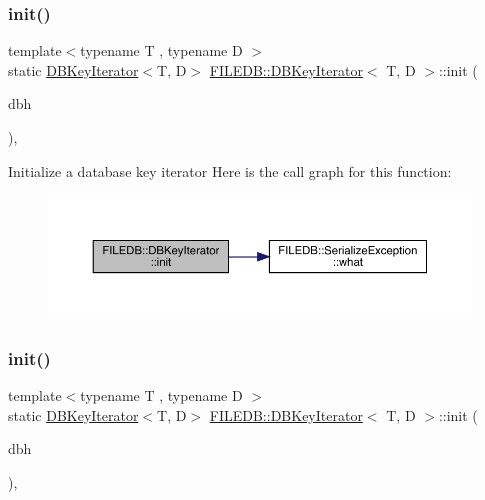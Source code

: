 \subsubsection{\texorpdfstring{init()}{init()}\hspace{0.1cm}{\footnotesize\ttfamily [2/3]}}
{\footnotesize\ttfamily template$<$typename T , typename D $>$ \\
static \mbox{\hyperlink{classFILEDB_1_1DBKeyIterator}{D\+B\+Key\+Iterator}}$<$T, D$>$ \mbox{\hyperlink{classFILEDB_1_1DBKeyIterator}{F\+I\+L\+E\+D\+B\+::\+D\+B\+Key\+Iterator}}$<$ T, D $>$\+::init (\begin{DoxyParamCaption}\item[{\mbox{\hyperlink{adat-devel_2other__libs_2filedb_2filehash_2ffdb__db_8h_a0b27b956926453a7a8141ea8e10f0df8}{F\+F\+D\+B\+\_\+\+DB}} $\ast$}]{dbh }\end{DoxyParamCaption})\hspace{0.3cm}{\ttfamily [inline]}, {\ttfamily [static]}}

Initialize a database key iterator Here is the call graph for this function\+:
\nopagebreak
\begin{figure}[H]
\begin{center}
\leavevmode
\includegraphics[width=350pt]{d4/d89/classFILEDB_1_1DBKeyIterator_af4a5e1eaeb6e5c491c5894f3e70f893c_cgraph}
\end{center}
\end{figure}
\mbox{\label{classFILEDB_1_1DBKeyIterator_af4a5e1eaeb6e5c491c5894f3e70f893c}} 
\subsubsection{\texorpdfstring{init()}{init()}\hspace{0.1cm}{\footnotesize\ttfamily [3/3]}}
{\footnotesize\ttfamily template$<$typename T , typename D $>$ \\
static \mbox{\hyperlink{classFILEDB_1_1DBKeyIterator}{D\+B\+Key\+Iterator}}$<$T, D$>$ \mbox{\hyperlink{classFILEDB_1_1DBKeyIterator}{F\+I\+L\+E\+D\+B\+::\+D\+B\+Key\+Iterator}}$<$ T, D $>$\+::init (\begin{DoxyParamCaption}\item[{\mbox{\hyperlink{adat-devel_2other__libs_2filedb_2filehash_2ffdb__db_8h_a0b27b956926453a7a8141ea8e10f0df8}{F\+F\+D\+B\+\_\+\+DB}} $\ast$}]{dbh }\end{DoxyParamCaption})\hspace{0.3cm}{\ttfamily [inline]}, {\ttfamily [static]}}

